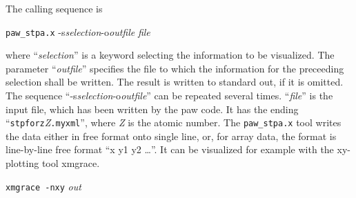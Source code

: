 \documentclass[final,12pt]{article}
\begin{document}
{{{The calling sequence is
\begin{center}
\verb|paw_stpa.x| 
 \quad-s\quad\textit{selection}\quad\textrm{-o}\quad\textit{outfile} \quad\textit{file}
\end{center}
where ``\textit{selection}'' is a keyword selecting the information to
be visualized.  The parameter ``\textit{outfile}'' specifies the file
to which the information for the preceeding selection shall be
written. The result is written to standard out, if it is omitted.  The
sequence
``-s\quad\textit{selection}\quad\textrm{-o}\quad\textit{outfile}'' can
be repeated several times.  ``\textit{file}'' is the input file, which
has been written by the paw code. It has the ending
``\verb|stpforz|\textit{Z}\verb|.myxml|'', where \textit{Z} is the
atomic number. The \verb|paw_stpa.x| tool writes the data either in
free format onto single line, or, for array data, the format is
line-by-line free format ``x y1 y2 \ldots''.  It can be visualized for
example with the xy-plotting tool xmgrace.
\begin{center}
\verb|xmgrace -nxy| \textit{out}
\end{center}

}}}
\end{document}
